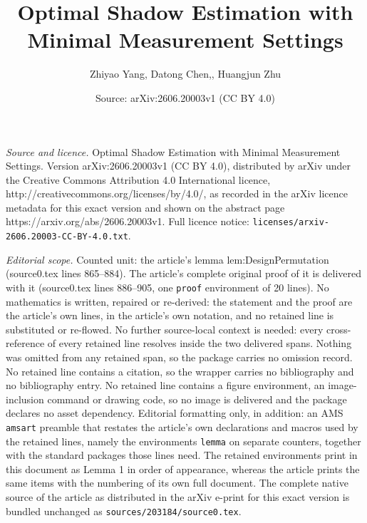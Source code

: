 \documentclass[10pt,a4paper]{amsart}
\title{Optimal Shadow Estimation with Minimal Measurement Settings}
\author{Zhiyao Yang, Datong Chen,, Huangjun Zhu}
\date{Source: arXiv:2606.20003v1 (CC BY 4.0)}
\begin{document}
\maketitle

\noindent\emph{Source and licence.} Optimal Shadow Estimation with Minimal Measurement Settings. Version arXiv:2606.20003v1 (CC BY 4.0), distributed by arXiv under the Creative Commons Attribution 4.0 International licence, http://creativecommons.org/licenses/by/4.0/, as recorded in the arXiv licence metadata for this exact version and shown on the abstract page https://arxiv.org/abs/2606.20003v1. Full licence notice: \texttt{licenses/arxiv-2606.20003-CC-BY-4.0.txt}.\par\smallskip

\noindent\textit{Editorial scope.} Counted unit: the article's lemma lem:DesignPermutation (source0.tex lines 865--884). The article's complete original proof of it is delivered with it (source0.tex lines 886--905, one \texttt{proof} environment of 20 lines). No mathematics is written, repaired or re-derived: the statement and the proof are the article's own lines, in the article's own notation, and no retained line is substituted or re-flowed.  No further source-local context is needed: every cross-reference of every retained line resolves inside the two delivered spans.  Nothing was omitted from any retained span, so the package carries no omission record.  No retained line contains a citation, so the wrapper carries no bibliography and no bibliography entry.  No retained line contains a figure environment, an image-inclusion command or drawing code, so no image is delivered and the package declares no asset dependency.  Editorial formatting only, in addition: an AMS \texttt{amsart} preamble that restates the article's own declarations and macros used by the retained lines, namely the environments \texttt{lemma} on separate counters, together with the standard packages those lines need.  The retained environments print in this document as Lemma 1 in order of appearance, whereas the article prints the same items with the numbering of its own full document.  The complete native source of the article as distributed in the arXiv e-print for this exact version is bundled unchanged as \texttt{sources/203184/source0.tex}.
\end{document}
